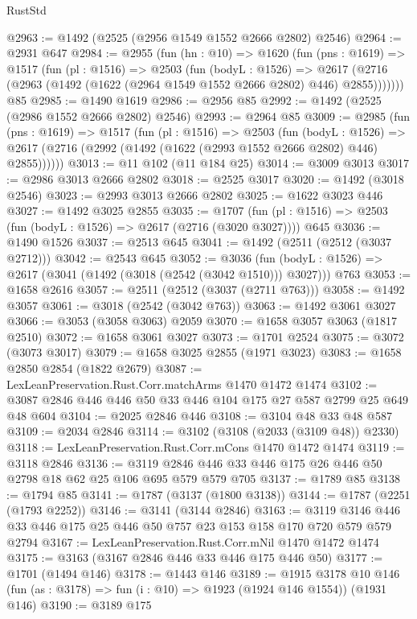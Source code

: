 \begin{lexlean}{RustStd}
\begin{coremodule}
@2963 := @1492 (@2525 (@2956 @1549 @1552 @2666 @2802) @2546)
@2964 := @2931 @647
@2984 := @2955
    (fun (hn : @10) =>
    @1620
      (fun (pns : @1619) =>
      @1517
        (fun (pl : @1516) =>
        @2503
          (fun (bodyL : @1526) =>
          @2617 (@2716 (@2963 (@1492 (@1622 (@2964 @1549 @1552 @2666 @2802) @446) @2855)))))))
    @85
@2985 := @1490 @1619
@2986 := @2956 @85
@2992 := @1492 (@2525 (@2986 @1552 @2666 @2802) @2546)
@2993 := @2964 @85
@3009 := @2985
    (fun (pns : @1619) =>
    @1517
      (fun (pl : @1516) =>
      @2503
        (fun (bodyL : @1526) =>
        @2617 (@2716 (@2992 (@1492 (@1622 (@2993 @1552 @2666 @2802) @446) @2855))))))
@3013 := @11 @102 (@11 @184 @25)
@3014 := @3009 @3013
@3017 := @2986 @3013 @2666 @2802
@3018 := @2525 @3017
@3020 := @1492 (@3018 @2546)
@3023 := @2993 @3013 @2666 @2802
@3025 := @1622 @3023 @446
@3027 := @1492 @3025 @2855
@3035 := @1707 (fun (pl : @1516) => @2503 (fun (bodyL : @1526) => @2617 (@2716 (@3020 @3027)))) @645
@3036 := @1490 @1526
@3037 := @2513 @645
@3041 := @1492 (@2511 (@2512 (@3037 @2712)))
@3042 := @2543 @645
@3052 := @3036
    (fun (bodyL : @1526) => @2617 (@3041 (@1492 (@3018 (@2542 (@3042 @1510))) @3027)))
    @763
@3053 := @1658 @2616
@3057 := @2511 (@2512 (@3037 (@2711 @763)))
@3058 := @1492 @3057
@3061 := @3018 (@2542 (@3042 @763))
@3063 := @1492 @3061 @3027
@3066 := @3053 (@3058 @3063) @2059
@3070 := @1658 @3057 @3063 (@1817 @2510)
@3072 := @1658 @3061 @3027
@3073 := @1701 @2524
@3075 := @3072 (@3073 @3017)
@3079 := @1658 @3025 @2855 (@1971 @3023)
@3083 := @1658 @2850 @2854 (@1822 @2679)
@3087 := LexLeanPreservation.Rust.Corr.matchArms @1470 @1472 @1474
@3102 := @3087 @2846 @446 @446 @50 @33 @446 @104 @175 @27 @587 @2799 @25 @649 @48 @604
@3104 := @2025 @2846 @446
@3108 := @3104 @48 @33 @48 @587
@3109 := @2034 @2846
@3114 := @3102 (@3108 (@2033 (@3109 @48)) @2330)
@3118 := LexLeanPreservation.Rust.Corr.mCons @1470 @1472 @1474
@3119 := @3118 @2846
@3136 := @3119 @2846 @446 @33 @446 @175 @26 @446 @50 @2798 @18 @62 @25 @106 @695 @579 @579 @705
@3137 := @1789 @85
@3138 := @1794 @85
@3141 := @1787 (@3137 (@1800 @3138))
@3144 := @1787 (@2251 (@1793 @2252))
@3146 := @3141 (@3144 @2846)
@3163 := @3119 @3146 @446 @33 @446 @175 @25 @446 @50 @757 @23 @153 @158 @170 @720 @579 @579 @2794
@3167 := LexLeanPreservation.Rust.Corr.mNil @1470 @1472 @1474
@3175 := @3163 (@3167 @2846 @446 @33 @446 @175 @446 @50)
@3177 := @1701 (@1494 @146)
@3178 := @1443 @146
@3189 := @1915
    @3178
    @10
    @146
    (fun (as : @3178) => fun (i : @10) => @1923 (@1924 @146 @1554))
    (@1931 @146)
@3190 := @3189 @175

\end{coremodule}
\end{lexlean}
